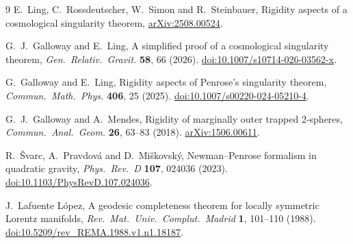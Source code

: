 \documentclass[11pt]{article}
\begin{document}
\begin{thebibliography}{9}
E.~Ling, C.~Rossdeutscher, W.~Simon and R.~Steinbauer,
Rigidity aspects of a cosmological singularity theorem,
\href{https://arxiv.org/abs/2508.00524}{arXiv:2508.00524}.

G.~J.~Galloway and E.~Ling,
A simplified proof of a cosmological singularity theorem,
\emph{Gen.\ Relativ.\ Gravit.} \textbf{58}, 66 (2026).
\href{https://doi.org/10.1007/s10714-026-03562-x}{doi:10.1007/s10714-026-03562-x}.

G.~Galloway and E.~Ling,
Rigidity aspects of Penrose's singularity theorem,
\emph{Commun.\ Math.\ Phys.} \textbf{406}, 25 (2025).
\href{https://doi.org/10.1007/s00220-024-05210-4}{doi:10.1007/s00220-024-05210-4}.

G.~J.~Galloway and A.~Mendes,
Rigidity of marginally outer trapped 2-spheres,
\emph{Commun.\ Anal.\ Geom.} \textbf{26}, 63--83 (2018).
\href{https://arxiv.org/abs/1506.00611}{arXiv:1506.00611}.

R.~\v{S}varc, A.~Pravdov\'a and D.~Mi\v{s}kovsk\'y,
Newman--Penrose formalism in quadratic gravity,
\emph{Phys.\ Rev.\ D} \textbf{107}, 024036 (2023).
\href{https://doi.org/10.1103/PhysRevD.107.024036}{doi:10.1103/PhysRevD.107.024036}.

J.~Lafuente L\'opez,
A geodesic completeness theorem for locally symmetric Lorentz manifolds,
\emph{Rev.\ Mat.\ Univ.\ Complut.\ Madrid} \textbf{1}, 101--110 (1988).
\href{https://doi.org/10.5209/rev_REMA.1988.v1.n1.18187}{doi:10.5209/rev\_REMA.1988.v1.n1.18187}.

\end{thebibliography}
\end{document}
